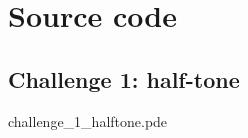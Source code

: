 \chapter{Source code}

\section{Challenge 1: half-tone}

\begin{codebox}{challenge\_1\_halftone.pde}
    
\end{codebox}